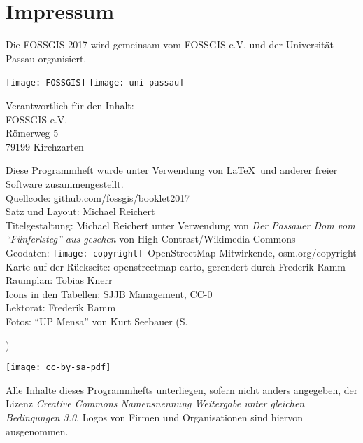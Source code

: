 \newpage
\section*{Impressum}
\label{impressum}
\pagestyle{cropmarksstyle}

\RaggedRight
{\small
Die FOSSGIS 2017 wird gemeinsam vom FOSSGIS e.V. und der Universität Passau organisiert.

\vspace{0.5em}
\texttt{[image: FOSSGIS]}
\hfill
\texttt{[image: uni-passau]}
\hfill

\vspace{0.5em}
\noindent Verantwortlich für den Inhalt:\\
FOSSGIS e.V.\\
Römerweg 5\\
79199 Kirchzarten

\vspace{0.5em}
\noindent Diese Programmheft wurde unter Verwendung von \LaTeX\ und 
anderer freier Software zusammengestellt.\\
Quellcode: github.com/fossgis/booklet2017\\
\noindent Satz und Layout: Michael Reichert\\
Titelgestaltung: Michael Reichert unter Verwendung von \emph{Der Passauer Dom vom "`Fünferlsteg"' aus gesehen} von High Contrast/Wikimedia Commons\\
Geodaten: \texttt{[image: copyright]}~Open\-Street\-Map-Mitwirkende, osm.org/copyright\\
Karte auf der Rückseite: openstreetmap-carto, gerendert durch Frederik Ramm\\
Raumplan: Tobias Knerr\\
Icons in den Tabellen: SJJB Management, CC-0\\
Lektorat: Frederik Ramm\\
Fotos: "`UP Mensa"' von Kurt Seebauer (S.~\pageref{social-event}})

\vspace{1em}
\noindent \begin{minipage}[htbp]{0.2\textwidth}
\noindent\texttt{[image: cc-by-sa-pdf]}
\end{minipage}
\hfill
\begin{minipage}[hbtp]{0.74\textwidth}\RaggedRight
\small
Alle Inhalte dieses Programmhefts unterliegen, sofern nicht anders angegeben, 
der Lizenz \emph{Creative Commons Namensnennung Weitergabe unter gleichen Bedingungen 3.0}.
Logos von Firmen und Organisationen sind hiervon ausgenommen.
\end{minipage}


